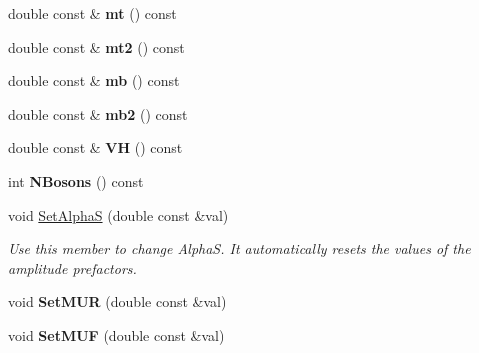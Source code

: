 \begin{DoxyCompactItemize}
\item 
\hypertarget{classHiggsModel_a913923ce15ea38a8a1576ea9e5d23d10}{double const \& {\bfseries mt} () const }\label{classHiggsModel_a913923ce15ea38a8a1576ea9e5d23d10}

\item 
\hypertarget{classHiggsModel_ad0685a0848a95342b272147317948d10}{double const \& {\bfseries mt2} () const }\label{classHiggsModel_ad0685a0848a95342b272147317948d10}

\item 
\hypertarget{classHiggsModel_a8ec3f6255ab720fb08a94937d436cdea}{double const \& {\bfseries mb} () const }\label{classHiggsModel_a8ec3f6255ab720fb08a94937d436cdea}

\item 
\hypertarget{classHiggsModel_a33ea2c639935f9971bdca5e5994325ff}{double const \& {\bfseries mb2} () const }\label{classHiggsModel_a33ea2c639935f9971bdca5e5994325ff}

\item 
\hypertarget{classHiggsModel_a9711ab1e2b584f86d75f6e53b9a35822}{double const \& {\bfseries V\-H} () const }\label{classHiggsModel_a9711ab1e2b584f86d75f6e53b9a35822}

\item 
\hypertarget{classHiggsModel_a08c33da1ef0b46ed04dd5f1f9f84ae9a}{int {\bfseries N\-Bosons} () const }\label{classHiggsModel_a08c33da1ef0b46ed04dd5f1f9f84ae9a}

\item 
\hypertarget{classHiggsModel_a5a3f7171856b2106141948544fc49f13}{void \hyperlink{classHiggsModel_a5a3f7171856b2106141948544fc49f13}{Set\-Alpha\-S} (double const \&val)}\label{classHiggsModel_a5a3f7171856b2106141948544fc49f13}

\begin{DoxyCompactList}\small\item\em Use this member to change Alpha\-S. It automatically resets the values of the amplitude prefactors. \end{DoxyCompactList}\item 
\hypertarget{classHiggsModel_a40b498b2555458a9abc4ea989e72ce91}{void {\bfseries Set\-M\-U\-R} (double const \&val)}\label{classHiggsModel_a40b498b2555458a9abc4ea989e72ce91}

\item 
\hypertarget{classHiggsModel_a8e8772814f7441352b226eb0566a263e}{void {\bfseries Set\-M\-U\-F} (double const \&val)}\label{classHiggsModel_a8e8772814f7441352b226eb0566a263e}


\end{DoxyCompactItemize}

